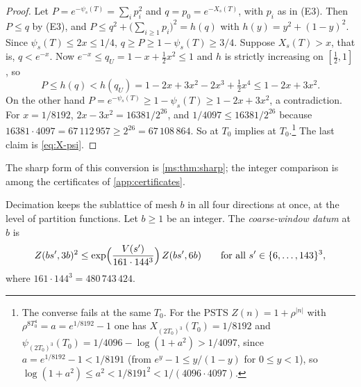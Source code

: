 \documentclass[11pt,a4paper]{amsart}
\theoremstyle{definition}
\theoremstyle{remark}
\numberwithin{equation}{section}
\newcommand{\PSTS}{\textup{PSTS}}          %
\newcommand{\TT}{\mathbb{T}}               %
\newcommand{\Zc}{\mathcal{Z}}              %
\newcommand{\XT}[2]{X_{#1}(#2)}            %
\newcommand{\psiT}[2]{\psi_{#1}(#2)}       %
\newcommand{\Vol}[1]{V(#1)}                %
\newcommand{\cube}[1]{(2#1)^3}             %
\newcommand{\dconst}{\frac{1}{4097}}       %
\newcommand{\xconst}{\frac{1}{8192}}       %
\newcommand{\dconstinl}{1/4097}            %
\newcommand{\xconstinl}{1/8192}            %
\newcommand{\Mcirc}{\text{\upshape(M$^{\circ}$)}}   %
\newcommand{\Bcirc}{\text{\upshape(B$^{\circ}$)}}   %
\newcommand{\CW}{\text{\upshape(CW)}}               %
\begin{document}
\begin{proof}
Let $P=e^{-\psiT{s}{T}}=\sum_ip_i^2$ and $q=p_0=e^{-\XT{s}{T}}$, with $p_i$ as in (E3). Then $P\le q$ by (E3), and $P\le q^2+\bigl(\sum_{i\ge1}p_i\bigr)^2=h(q)$ with $h(y)=y^2+(1-y)^2$. Since $\psiT{s}{T}\le2x\le1/4$, $q\ge P\ge1-\psiT{s}{T}\ge3/4$. Suppose $\XT{s}{T}>x$, that is, $q<e^{-x}$. Now $e^{-x}\le q_U=1-x+\frac12x^2\le1$ and $h$ is strictly increasing on $[\frac12,1]$, so
\[
P\le h(q)<h(q_U)=1-2x+3x^2-2x^3+\tfrac12x^4\le1-2x+3x^2 .
\]
On the other hand $P=e^{-\psiT{s}{T}}\ge1-\psiT{s}{T}\ge1-2x+3x^2$, a contradiction. For $x=\xconstinl$, $2x-3x^2=16381/2^{26}$, and $\dconstinl\le16381/2^{26}$ because $16381\cdot4097=67\,112\,957\ge2^{26}=67\,108\,864$. So \Mcirc{} at $T_0$ implies \Bcirc{} at $T_0$.\footnote{The converse fails at the same $T_0$. For the \PSTS{} $Z(n)=1+\rho^{|n|}$ with $\rho^{8T_0^4}=a=e^{\xconstinl}-1$ one has $\XT{\cube{T_0}}{T_0}=\xconstinl$ and $\psiT{\cube{T_0}}{T_0}=1/4096-\log(1+a^2)>\dconstinl$, since $a=e^{1/8192}-1<1/8191$ (from $e^y-1\le y/(1-y)$ for $0\le y<1$), so $\log(1+a^2)\le a^2<1/8191^2<1/(4096\cdot4097)$.} The last claim is \eqref{eq:X-psi}.
\end{proof}

The sharp form of this conversion is \cref{ms:thm:sharp}; the integer comparison is among the certificates of \cref{app:certificates}.

Decimation keeps the sublattice of mesh $b$ in all four directions at once, at the level of partition functions. Let $b\ge1$ be an integer. The \emph{coarse-window datum} \CW{} at $b$ is
\begin{equation}\label{eq:CW}
Z(bs',3b)^2\le\exp\Bigl(\frac{\Vol{s'}}{161\cdot144^3}\Bigr)\,Z(bs',6b)\qquad\text{for all }s'\in\{6,\dots,143\}^3,
\end{equation}
where $161\cdot144^3=480\,743\,424$.
\end{document}
